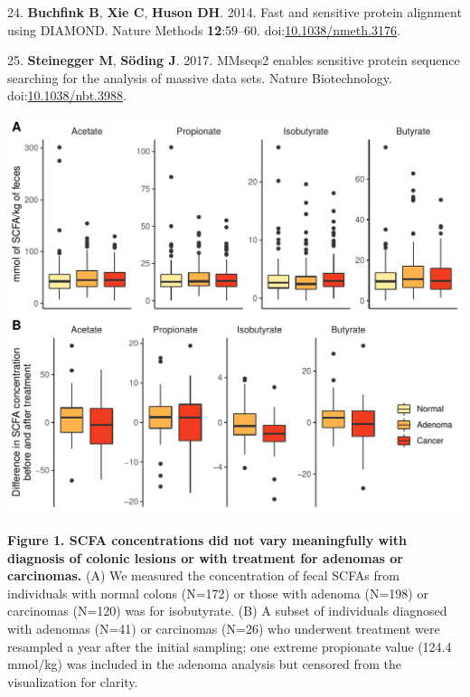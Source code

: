 \documentclass[11pt,]{article}
\begin{document}
\leavevmode\hypertarget{ref-Buchfink2014}{}%
24. \textbf{Buchfink B}, \textbf{Xie C}, \textbf{Huson DH}. 2014. Fast
and sensitive protein alignment using DIAMOND. Nature Methods
\textbf{12}:59--60.
doi:\href{https://doi.org/10.1038/nmeth.3176}{10.1038/nmeth.3176}.

\leavevmode\hypertarget{ref-Steinegger2017}{}%
25. \textbf{Steinegger M}, \textbf{Söding J}. 2017. MMseqs2 enables
sensitive protein sequence searching for the analysis of massive data
sets. Nature Biotechnology.
doi:\href{https://doi.org/10.1038/nbt.3988}{10.1038/nbt.3988}.

\newpage

\includegraphics{../results/figures/scfa_comparisons.pdf}

\textbf{Figure 1. SCFA concentrations did not vary meaningfully with
diagnosis of colonic lesions or with treatment for adenomas or
carcinomas.} (A) We measured the concentration of fecal SCFAs from
individuals with normal colons (N=172) or those with adenoma (N=198) or
carcinomas (N=120) was for isobutyrate. (B) A subset of individuals
diagnosed with adenomas (N=41) or carcinomas (N=26) who underwent
treatment were resampled a year after the initial sampling; one extreme
propionate value (124.4 mmol/kg) was included in the adenoma analysis
but censored from the visualization for clarity.

\newpage
\end{document}
